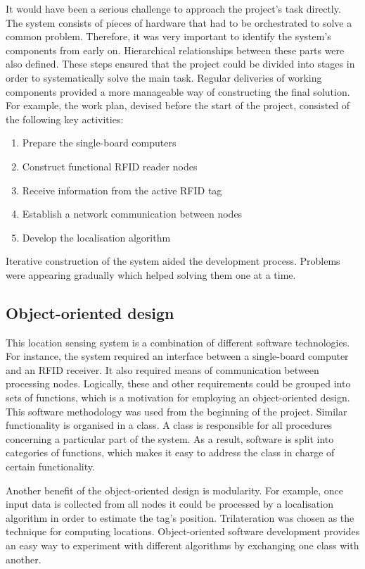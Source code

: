 It would have been a serious challenge to approach the project's task directly. The system consists of pieces of hardware that had to be orchestrated to solve a common problem. Therefore, it was very important to identify the system's components from early on. Hierarchical relationships between these parts were also defined. These steps ensured that the project could be divided into stages in order to systematically solve the main task. Regular deliveries of working components provided a more manageable way of constructing the final solution. For example, the work plan, devised before the start of the project, consisted of the following key activities:

\begin{enumerate}
 	\item Prepare the single-board computers
 	\item Construct functional RFID reader nodes
 	\item Receive information from the active RFID tag
 	\item Establish a network communication between nodes
 	\item Develop the localisation algorithm
 \end{enumerate}

Iterative construction of the system aided the development process. Problems were appearing gradually which helped solving them one at a time. 

\subsection{Object-oriented design}

This location sensing system is a combination of different software technologies. For instance, the system required an interface between a single-board computer and an RFID receiver. It also required means of communication between processing nodes. Logically, these and other requirements could be grouped into sets of functions, which is a motivation for employing an object-oriented design. This software methodology was used from the beginning of the project. Similar functionality is organised in a class. A class is responsible for all procedures concerning a particular part of the system. As a result, software is split into categories of functions, which makes it easy to address the class in charge of certain functionality.

Another benefit of the object-oriented design is modularity. For example, once input data is collected from all nodes it could be processed by a localisation algorithm in order to estimate the tag's position. Trilateration was chosen as the technique for computing locations. Object-oriented software development provides an easy way to experiment with different algorithms by exchanging one class with another.

